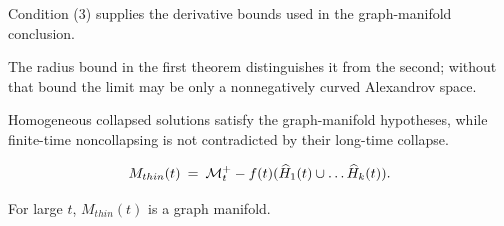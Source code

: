 \begin{remark}
\label{rem:kl-thin-part-graph-manifold-structural-remark-thick-thin-geometry}



Condition (3) supplies the derivative bounds used in the graph-manifold conclusion.
\end{remark}

\begin{remark}
\label{rem:kl-thin-part-graph-manifold-positivity-thick-thin-geometry}



The radius bound in the first theorem distinguishes it from the second; without that bound the limit may be only a nonnegatively curved Alexandrov space.
\end{remark}

\begin{remark}
\label{rem:kl-thin-part-graph-manifold-existence-thick-thin-geometry}



Homogeneous collapsed solutions satisfy the graph-manifold hypotheses, while finite-time noncollapsing is not contradicted by their long-time collapse.
\end{remark}

\begin{equation}
M_{thin}(t) \: = \: {\mathcal M}_t^+ - f(t) (\widehat{H}_1(t) \cup \ldots \widehat{H}_k(t)).
\end{equation}

\begin{proposition}
  \label{prop:kl-thin-part-graph-manifold-thick-thin-geometry-proposition}
 \label{thingraph}
For large $t$, $M_{thin}(t)$ is a graph manifold.
\end{proposition}


